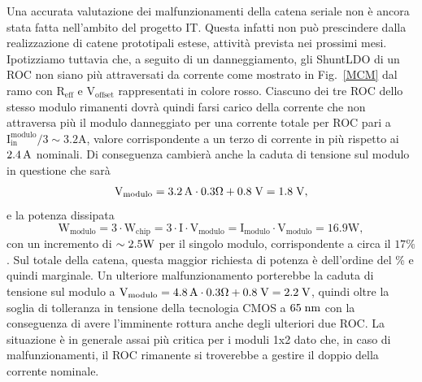 Una accurata valutazione dei malfunzionamenti della catena seriale non \`e ancora stata fatta nell'ambito del progetto IT. Questa infatti non pu\`o prescindere dalla realizzazione di catene prototipali estese, attivit\`a prevista nei prossimi mesi. Ipotizziamo tuttavia che, a seguito di un danneggiamento, gli ShuntLDO di un ROC non siano pi\`u attraversati da corrente come mostrato in Fig.~\ref{MCM} dal ramo con $\mathrm{R_{eff}}$ e $\mathrm{V_{offset}}$ rappresentati in colore rosso.
Ciascuno dei tre ROC dello stesso modulo rimanenti dovrà quindi farsi carico della corrente che non attraversa pi\`u il modulo danneggiato per una corrente totale per ROC pari a $\mathrm{I_{in}^{modulo}/3 \sim 3.2 A}$, valore corrispondente a un terzo di corrente in più rispetto ai $2.4\rm \, A$ nominali.
Di conseguenza cambier\`a anche la caduta di tensione sul modulo in questione che sarà 
\begin{equation*}
  \mathrm{V_{modulo} = 3.2\rm \, A \cdot 0.3 \Omega + 0.8\rm \; V = 1.8 \rm \; V},
\end{equation*}
e la potenza dissipata
\begin{equation*}
  \mathrm{W_{modulo} = 3 \cdot W_{chip} = 3 \cdot I \cdot V_{modulo} = I_{modulo} \cdot V_{modulo} = 16.9W},
\end{equation*}
con un incremento di $\sim2.5{\mathrm W}$ per il singolo modulo, corrispondente a circa il $17\%$. Sul totale della catena, questa maggior richiesta di potenza \`e dell'ordine del \% e quindi marginale. Un ulteriore malfunzionamento porterebbe la caduta di tensione sul modulo a $\mathrm{V_{modulo} = 4.8\rm \, A \cdot 0.3 \Omega + 0.8\rm \; V = 2.2 \rm \; V}$, quindi oltre la soglia di tolleranza in tensione della tecnologia CMOS a $65\rm \; nm$ con la conseguenza di avere l'imminente rottura anche degli ulteriori due ROC. La situazione \`e in generale assai pi\`u critica per i moduli 1x2 dato che, in caso di malfunzionamenti, il ROC rimanente si troverebbe a gestire il doppio della corrente nominale.


